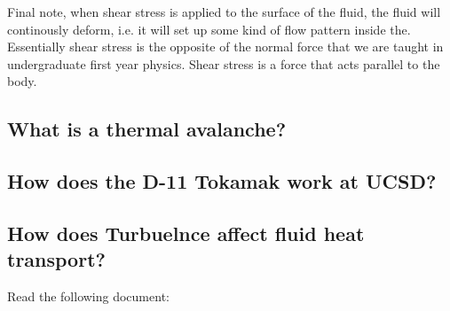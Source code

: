 Final note, when shear stress is applied to the surface of the fluid, the fluid will continously deform, i.e. it will set up some kind of flow pattern inside the. Essentially shear stress is the opposite of the normal force that we are taught in undergraduate first year physics. Shear stress is a force that acts parallel to the body.

\subsection{What is a thermal avalanche?}

\subsection{How does the D-11 Tokamak work at UCSD?}

\subsection{How does Turbuelnce affect fluid heat transport?}
Read the following document: \cite{1992ApJ...388...64W}
 
